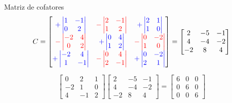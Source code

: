 \documentclass{beamer}
\begin{document}
\begin{frame}{Matriz de cofatores}
\begin{gather*}
  C=
\begin{bmatrix}
  \textcolor{blue}{ +
\begin{vmatrix}
1 & -1 \\ 0 & 2
\end{vmatrix}}&
\textcolor{red}{-\begin{vmatrix}
2 & -1 \\ 1 & 2
\end{vmatrix}}&
\textcolor{blue}{+\begin{vmatrix}
2 & 1 \\ 1 & 0
\end{vmatrix}} \\
\textcolor{red}{-\begin{vmatrix}
-2 & 4 \\ 0 & 2
\end{vmatrix}} & 
\textcolor{blue}{+\begin{vmatrix}
0 & 4 \\ 1 & 2
\end{vmatrix}} &
\textcolor{red}{-\begin{vmatrix}
0 & -2 \\ 1 & 0
\end{vmatrix}} \\
\textcolor{blue}{+\begin{vmatrix}
-2 & 4 \\ 1 & -1
\end{vmatrix}}&
\textcolor{red}{-\begin{vmatrix}
0 & 4 \\ 2 & {-1}
\end{vmatrix}}&
\textcolor{blue}{+\begin{vmatrix}
0 & -2 \\ 2 & 1
\end{vmatrix}}
\end{bmatrix}= \begin{bmatrix}
  2 & -5 & -1 \\ 4 & -4 & -2 \\ -2 & 8 & 4
\end{bmatrix}
\end{gather*}
\end{frame}

\begin{frame}
  $$
 \begin{bmatrix}
   0 & 2 & 1 \\ -2 & 1 & 0 \\ 4 & -1 & 2
 \end{bmatrix} 
  \begin{bmatrix}
    2 & -5 & -1 \\ 4 & -4 & -2 \\ -2 & 8 & 4
  \end{bmatrix}= \begin{bmatrix}
    6 & 0 & 0 \\ 0 & 6 & 0 \\ 0 & 0 & 6
  \end{bmatrix}
  $$
\end{frame}
\end{document}
